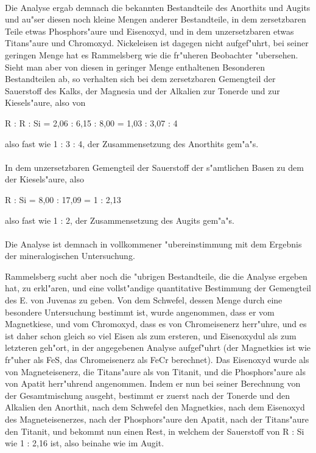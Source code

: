 \documentclass[a4paper, 11pt, oneside, german]{article}
\begin{document}
\paragraph{}
Die Analyse ergab demnach die bekannten Bestandteile des Anorthits und Augits und au"ser diesen noch kleine Mengen anderer Bestandteile, in dem zersetzbaren Teile etwas Phosphors"aure und Eisenoxyd, und in dem unzersetzbaren etwas Titans"aure und Chromoxyd. Nickeleisen ist dagegen nicht aufgef"uhrt, bei seiner geringen Menge hat es Rammelsberg wie die fr"uheren Beobachter "ubersehen. Sieht man aber von diesen in geringer Menge enthaltenen Besonderen Bestandteilen ab, so verhalten sich bei dem zersetzbaren Gemengteil der Sauerstoff des Kalks, der Magnesia und der Alkalien zur Tonerde und zur Kiesels"aure, also von
\begin{center}
R : R : Si = 2,06 : 6,15 : 8,00 = 1,03 : 3,07 : 4
\end{center}
also fast wie 1 : 3 : 4, der Zusammensetzung des Anorthits gem"a"s.
\paragraph{}
In dem unzersetzbaren Gemengteil der Sauerstoff der s"amtlichen Basen zu dem der Kiesels"aure, also
\begin{center}
R : Si = 8,00 : 17,09 = 1 : 2,13
\end{center}
also fast wie 1 : 2, der Zusammensetzung des Augits gem"a"s.
\paragraph{}
Die Analyse ist demnach in vollkommener "ubereinstimmung mit dem Ergebnis der mineralogischen Untersuchung.

Rammelsberg sucht aber noch die "ubrigen Bestandteile, die die Analyse ergeben hat, zu erkl"aren, und eine vollst"andige quantitative Bestimmung der Gemengteil des E. von Juvenas zu geben. Von dem Schwefel, dessen Menge durch eine besondere Untersuchung bestimmt ist, wurde angenommen, dass er vom Magnetkiese, und vom Chromoxyd, dass es von Chromeisenerz herr"uhre, und es ist daher schon gleich so viel Eisen als zum ersteren, und Eisenoxydul als zum letzteren geh"ort, in der angegebenen Analyse aufgef"uhrt (der Magnetkies ist wie fr"uher als FeS, das Chromeisenerz als FeCr berechnet). Das Eisenoxyd wurde als von Magneteisenerz, die Titans"aure als von Titanit, und die Phosphors"aure als von Apatit herr"uhrend angenommen. Indem er nun bei seiner Berechnung von der Gesamtmischung ausgeht, bestimmt er zuerst nach der Tonerde und den Alkalien den Anorthit, nach dem Schwefel den Magnetkies, nach dem Eisenoxyd des Magneteisenerzes, nach der Phosphors"aure den Apatit, nach der Titans"aure den Titanit, und bekommt nun einen Rest, in welchem der Sauerstoff von R : Si wie 1 : 2,16 ist, also beinahe wie im Augit.
\end{document}
